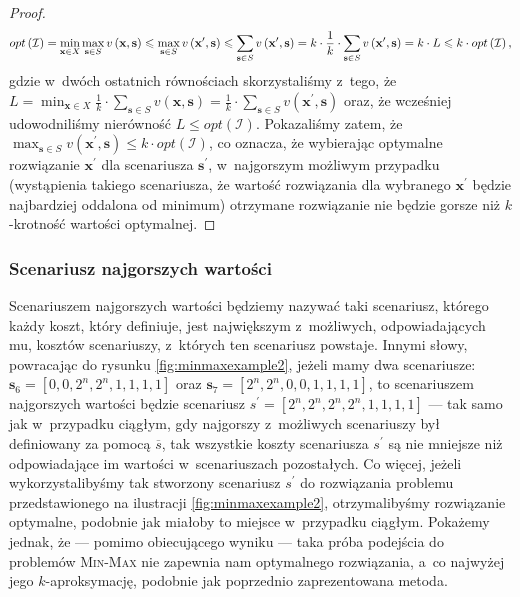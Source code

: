 \begin{proof}
	\begin{eqnarray}
		opt \left( \mathcal{I} \right) = \min_{ \mathclap{\textbf{x} \in X}} \max_{\textbf{s} \in S} v \left( \textbf{x}, \textbf{s} \right) \leqslant \max_{\textbf{s} \in S} v \left( \textbf{x}^{\prime}, \textbf{s} \right) \leqslant \sum_{\textbf{s} \in S} v \left( \textbf{x}^{\prime}, \textbf{s} \right) = k \cdot \frac{1}{k} \cdot \sum_{\textbf{s} \in S} v \left( \textbf{x}^{\prime}, \textbf{s} \right) = k \cdot L \leqslant k \cdot opt \left( \mathcal{I} \right)\text{,}
	\end{eqnarray}
	gdzie w~dwóch ostatnich równościach skorzystaliśmy z~tego, że $L = \min_{ \textbf{x} \in X} \frac{1}{k} \cdot \sum_{\textbf{s} \in S} v \left( \textbf{x}, \textbf{s} \right) = \frac{1}{k} \cdot \sum_{\textbf{s} \in S} v \left( \textbf{x}^{\prime}, \textbf{s} \right)$ oraz, że wcześniej udowodniliśmy nierówność $L \leqslant opt \left( \mathcal{I} \right)$.
	Pokazaliśmy zatem, że $\max_{\textbf{s} \in S} v \left( \textbf{x}^{\prime}, \textbf{s} \right) \leqslant k \cdot opt \left( \mathcal{I} \right)$, co oznacza, że wybierając optymalne rozwiązanie $\textbf{x}^{\prime}$ dla scenariusza $\textbf{s}^{\prime}$, w~najgorszym możliwym przypadku (wystąpienia takiego scenariusza, że wartość rozwiązania dla wybranego $\textbf{x}^{\prime}$ będzie najbardziej oddalona od minimum) otrzymane rozwiązanie nie będzie gorsze niż $k$-krotność wartości optymalnej.
\end{proof}


\subsubsection{Scenariusz najgorszych wartości}


Scenariuszem najgorszych wartości będziemy nazywać taki scenariusz, którego każdy koszt, który definiuje, jest największym z~możliwych, odpowiadających mu, kosztów scenariuszy, z~których ten scenariusz powstaje.
Innymi słowy, powracając do rysunku \ref{fig:minmaxexample2}, jeżeli mamy dwa scenariusze: $\textbf{s}_{6} = \left[ 0, 0, 2^{n}, 2^{n}, 1, 1, 1, 1 \right]$ oraz $\textbf{s}_{7} = \left[ 2^{n}, 2^{n}, 0, 0, 1, 1, 1, 1 \right]$, to scenariuszem najgorszych wartości będzie scenariusz $s^{\prime} = \left[ 2^{n}, 2^{n}, 2^{n}, 2^{n}, 1, 1, 1, 1 \right]$ --- tak samo jak w~przypadku ciągłym, gdy najgorszy z~możliwych scenariuszy był definiowany za pomocą $\overline{s}$, tak wszystkie koszty scenariusza $s^{\prime}$ są nie mniejsze niż odpowiadające im wartości w~scenariuszach pozostałych.
Co więcej, jeżeli wykorzystalibyśmy tak stworzony scenariusz $s^{\prime}$ do rozwiązania problemu przedstawionego na ilustracji \ref{fig:minmaxexample2}, otrzymalibyśmy rozwiązanie optymalne, podobnie jak miałoby to miejsce w~przypadku ciągłym.
Pokażemy jednak, że --- pomimo obiecującego wyniku --- taka próba podejścia do problemów \textsc{Min-Max} nie zapewnia nam optymalnego rozwiązania, a~co najwyżej jego $k$-aproksymację, podobnie jak poprzednio zaprezentowana metoda.

